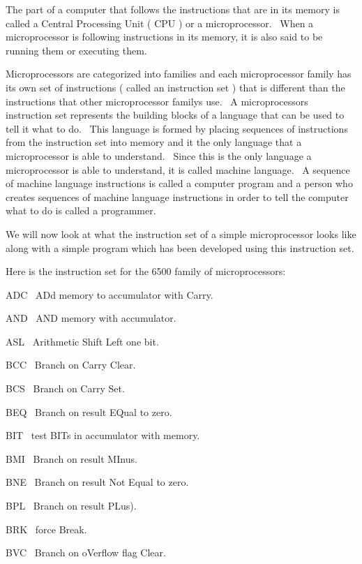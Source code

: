 \documentclass[12pt,twoside]{book}
\begin{document}
\bigskip

The part of a computer that follows the instructions that are in its
memory is called a Central Processing Unit ( CPU ) or a microprocessor.
\ When a microprocessor is following instructions in its memory, it is
also said to be running them or executing them.


\bigskip

Microprocessors are categorized into families and each microprocessor
family has its own set of instructions ( called an instruction set )
that is different than the instructions that other microprocessor
family{\textquotesingle}s use. \ A microprocessor{\textquotesingle}s
instruction set represents the building blocks of a language that can
be used to tell it what to do. \ This language is formed by placing
sequences of instructions from the instruction set into memory and it
the only language that a microprocessor is able to understand. \ Since
this is the only language a microprocessor is able to understand, it is
called machine language. \ A sequence of machine language instructions
is called a computer program and a person who creates sequences of
machine language instructions in order to tell the computer what to do
is called a programmer.


\bigskip

We will now look at what the instruction set of a simple microprocessor
looks like along with a simple program which has been developed using
this instruction set.


\bigskip

Here is the instruction set for the 6500 family of microprocessors:


\bigskip

ADC \ ADd memory to accumulator with Carry.

AND \ AND memory with accumulator.

ASL \ Arithmetic Shift Left one bit.

BCC \ Branch on Carry Clear.

BCS \ Branch on Carry Set.

BEQ \ Branch on result EQual to zero.

BIT \ test BITs in accumulator with memory.

BMI \ Branch on result MInus.

BNE \ Branch on result Not Equal to zero.

BPL \ Branch on result PLus).

BRK \ force Break.

BVC \ Branch on oVerflow flag Clear.
\end{document}
